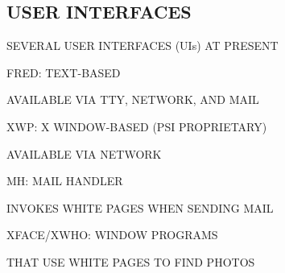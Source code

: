 \begin{bwslide}
\part*	{USER INTERFACES}\bf

\begin{nrtc}
\item	SEVERAL USER INTERFACES (UIs) AT PRESENT
    \begin{nrtc}
    \item	FRED: TEXT-BASED
	\begin{nrtc}
	\item	AVAILABLE VIA TTY, NETWORK, AND MAIL
	\end{nrtc}

    \item	XWP: X WINDOW-BASED (PSI PROPRIETARY)
	\begin{nrtc}
	\item	AVAILABLE VIA NETWORK
	\end{nrtc}

    \item	MH: MAIL HANDLER
	\begin{nrtc}
	\item	INVOKES WHITE PAGES WHEN SENDING MAIL
	\end{nrtc}

    \item	XFACE/XWHO: WINDOW PROGRAMS
	\begin{nrtc}
	\item	THAT USE WHITE PAGES TO FIND PHOTOS
	\end{nrtc}
    \end{nrtc}
\end{nrtc}
\end{bwslide}


